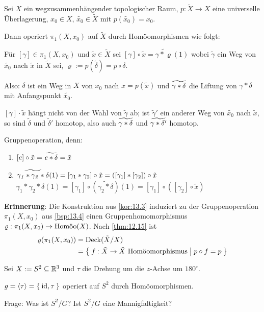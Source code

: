 \begin{beispiel}\label{bsp:13.4}%
    Sei $X$ ein wegzusammenhängender topologischer Raum, $p: \tilde{X} \rightarrow X$
    eine universelle Überlagerung, $x_0 \in X$, $\tilde{x_0} \in \tilde{X}$ mit
    $p(\tilde{x_0}) = x_0$.

    Dann operiert $\pi_1(X, x_0)$ auf $\tilde{X}$ durch Homöomorphismen wie folgt:

    Für $[\gamma] \in \pi_1(X, x_0)$ und $\tilde{x} \in \tilde{X}$ sei
    $[\gamma] \circ \tilde{x} = \tilde{\gamma * \varrho} (1)$ wobei
    $\tilde{\gamma}$ ein Weg von $\tilde{x_0}$ nach $\tilde{x}$ in
    $\tilde{X}$ sei, $\varrho := p(\tilde{\delta}) = p \circ \delta$.

    Also: $\delta$ ist ein Weg in $X$ von $x_0$ nach $x=p(\tilde{x})$
    und $\rtilde{\gamma * \delta}$ die Liftung von $\gamma * \delta$
    mit Anfangspunkt $\tilde{x_0}$.

    $[\gamma] \cdot \tilde{x}$ hängt nicht von der Wahl von $\tilde{\gamma}$
    ab; ist $\tilde{\gamma}'$ ein anderer Weg von $\tilde{x_0}$ nach
    $\tilde{x}$, so sind $\tilde{\delta}$ und $\tilde{\delta}'$ homotop,
    also auch $\rtilde{\gamma * \delta}$ und $\rtilde{\gamma * \delta'}$
    homotop.

    Gruppenoperation, denn:
    \begin{enumerate}[label=\roman*)]
        \item $[e] \circ \tilde{x} = \rtilde{e * \delta} = \tilde{x}$
        \item $\rtilde{\gamma_1 * \gamma_2 * \delta}(1) = [\gamma_1 * \gamma_2] \circ \tilde{x} = ([\gamma_1] * [\gamma_2]) \circ \tilde{x}$\\
              $\gamma_1 * \gamma_2 * \delta(1) = [\gamma_1] \circ (\tilde{\gamma_2 * \delta})(1) = [\gamma_1] \circ ([\gamma_2] \circ \tilde{x})$ 
    \end{enumerate}
\end{beispiel}

\textbf{Erinnerung}:%
Die Konstruktion aus \cref{kor:13.3} induziert zu der Gruppenoperation
$\pi_1(X, x_0)$ aus \cref{bsp:13.4} einen Gruppenhomomorphismus
$\varrho: \pi_1(X, x_0) \rightarrow \Homoo(X)$. Nach \cref{thm:12.15}
ist \begin{align*}\varrho(\pi_1(X, x_0)) &= \Deck(\tilde{X} / X)\\
                                         &= \Set{f: \tilde{X} \rightarrow \tilde{X} \text{ Homöomorphismus} | p \circ f = p}
    \end{align*}

\begin{beispiel}%
    Sei $X := S^2 \subseteq \mdr^3$ und $\tau$ die Drehung um die $z$-Achse
    um $180^\circ$.

    $g = \langle \tau \rangle = \Set{\id, \tau}$ operiert auf $S^2$
    durch Homöomorphismen.

    Frage: Was ist $S^2 / G$? Ist $S^2 / G$ eine Mannigfaltigkeit?
\end{beispiel}


